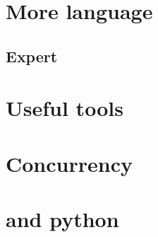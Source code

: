 \documentclass[compress]{beamer}
\begin{document}
\section[More]{More language}

\begin{advanced}
  
\end{advanced}

\begin{advanced}
  
  
\end{advanced}



\begin{advanced}
  
  
  
\end{advanced}

\begin{advanced}
  
\end{advanced}

\begin{advanced}
  \section[exp]{Expert \cpp}
  
  
  
  
  
  
  
\end{advanced}

\section[Tool]{Useful tools}






\begin{advanced}
  
  
  
  
  

  \section[conc]{Concurrency}
  
  
  
  
  

  \section[py]{\cpp and python}
  
  
  
  
\end{advanced}
\end{document}
